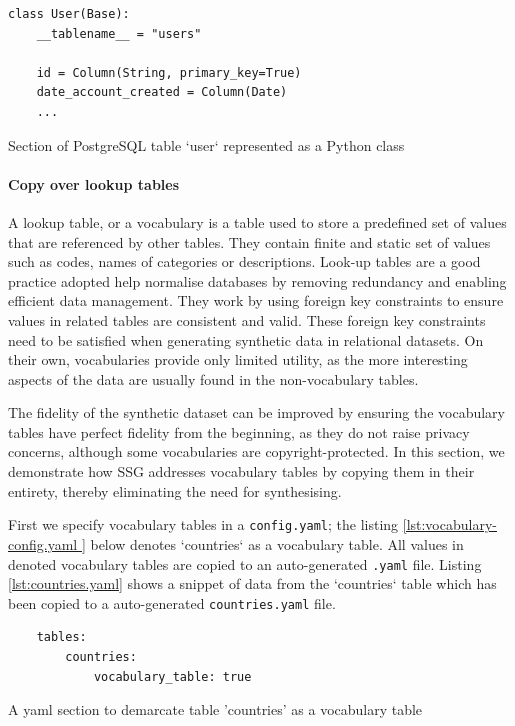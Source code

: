 \documentclass[11pt]{article}
\begin{document}
\begin{listing}[H]
\begin{verbatim}
class User(Base):
    __tablename__ = "users"

    id = Column(String, primary_key=True)
    date_account_created = Column(Date)
    ...
\end{verbatim}
\caption{Section of PostgreSQL table `user` represented as a Python class}
\label{lst:orm.py}
\end{listing}

\paragraph{Copy over lookup tables}

A lookup table, or a vocabulary is a table used to store a predefined set of values that are referenced by other tables. They contain finite and static set of values such as codes, names of categories or descriptions. Look-up tables are a good practice adopted help normalise databases by removing redundancy and enabling efficient data management. They work by using foreign key constraints to ensure values in related tables are consistent and valid. These foreign key constraints need to be satisfied when generating synthetic data in relational datasets. On their own, vocabularies provide only limited utility, as the more interesting aspects of the data are usually found in the non-vocabulary tables. 

The fidelity of the synthetic dataset can be improved by ensuring the vocabulary tables have perfect fidelity from the beginning, as they do not raise privacy concerns, although some vocabularies are copyright-protected. In this section, we demonstrate how SSG addresses vocabulary tables by copying them in their entirety, thereby eliminating the need for synthesising.

First we specify vocabulary tables in a \texttt{config.yaml}; the listing \ref{lst:vocabulary-config.yaml } below denotes `countries` as a vocabulary table. All values in denoted vocabulary tables are copied to an auto-generated \texttt{.yaml} file. Listing \ref{lst:countries.yaml} shows a snippet of data from the `countries` table which has been copied to a auto-generated \texttt{countries.yaml} file.

\begin{listing}[H]
\begin{verbatim}
    tables:
        countries:
            vocabulary_table: true
\end{verbatim}
\caption{A yaml section to demarcate table 'countries' as a vocabulary table}
\label{lst:vocabulary-config.yaml }
\end{listing}
\end{document}
